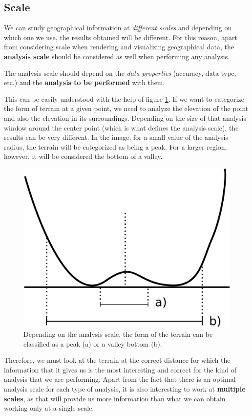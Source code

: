 \subsection{Scale}

We can study geographical information at \emph{different scales} and depending on which one we use, the results obtained will be different. For this reason, apart from considering scale when rendering and visualizing geographical data, the \textbf{analysis scale} should be considered as well when performing any analysis.

The analysis scale should depend on the \emph{data properties} (accuracy, data type, etc.) and the \textbf{analysis to be performed} with them.

This can be easily understood with the help of figure \ref{Fig:Scales}. If we want to categorize the form of terrain at a given point, we need to analyze the elevation of the point and also the elevation in its surroundings. Depending on the size of that analysis window around the center point (which is what defines the analysis scale), the results can be very different. In the image, for a small value of the analysis radius, the terrain will be categorized as being a peak. For a larger region, however, it will be considered the bottom of a valley.

\begin{figure}[h]   
\centering
\includegraphics[width= .45\columnwidth]{Analysis/Scales.pdf}
\caption{\small Depending on the analysis scale, the form of the terrain can   be classified as a peak (a) or a valley bottom (b).}
\label{Fig:Scales} 
\end{figure}

Therefore, we must look at the terrain at the correct distance for which the information that it gives us is the most interesting and correct for the kind of analysis that we are performing. Apart from the fact that there is an optimal analysis scale for each type of analysis, it is also interesting to work at \textbf{multiple scales}, as that will provide us more information than what we can obtain working only at a single scale.


